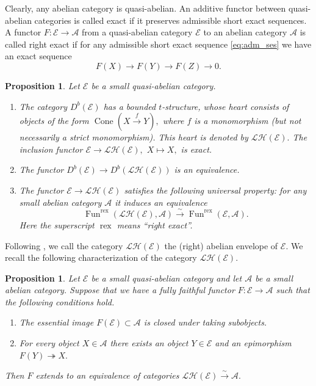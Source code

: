 \documentclass[11pt,leqno]{amsart}
\newtheorem{prop}[theo]{Proposition}
\numberwithin{equation}{section}
\newcommand{\xto}{\xrightarrow}
\newcommand{\onto}{\twoheadrightarrow}
\newcommand{\rex}{\operatorname{rex}}
\newcommand{\Cone}{\operatorname{Cone}}
\newcommand{\cL}{{\mathcal L}}
\newcommand{\cA}{{\mathcal A}}
\newcommand{\cE}{{\mathcal E}}
\newcommand{\cH}{{\mathcal H}}
\newcommand{\Fun}{\operatorname{Fun}}
\begin{document}
Clearly, any abelian category is quasi-abelian. An additive functor between quasi-abelian categories is called exact if it preserves admissible short exact sequences.
A functor $F:\cE\to\cA$ from a quasi-abelian category $\cE$ to an abelian category $\cA$ is called right exact if for any admissible short exact sequence \eqref{eq:adm_ses} we have an exact sequence
\begin{equation*}
F(X)\to F(Y)\to F(Z)\to 0.
\end{equation*}

\begin{prop}\label{prop:generalities_on_abelian_envelope}\cite[Definition 1.2.18, Propositions 1.2.32 and 1.2.34]{Sch99} Let $\cE$ be a small quasi-abelian category. 
\begin{enumerate}[label=(\roman*),ref=(\roman*)]
	\item The category $D^b(\cE)$ has a bounded $t$-structure, whose heart consists of objects of the form $\Cone(X\xto{f} Y),$ where $f$ is a monomorphism (but not necessarily a strict monomorphism). This heart is denoted by $\cL\cH(\cE).$ The inclusion functor $\cE\to\cL\cH(\cE),$ $X\mapsto X,$ is exact.
	\item The functor $D^b(\cE)\to D^b(\cL\cH(\cE))$ is an equivalence.
	\item The functor $\cE\to \cL\cH(\cE)$ satisfies the following universal property: for any small abelian category $\cA$ it induces an equivalence
	\begin{equation*}
	\Fun^{\rex}(\cL\cH(\cE),\cA)\xto{\sim}\Fun^{\rex}(\cE,\cA).
	\end{equation*}
	Here the superscript $\rex$ means ``right exact''.
\end{enumerate}
\end{prop}

Following \cite[Section 1.2.4]{Sch99}, we call the category $\cL\cH(\cE)$ the (right) abelian envelope of $\cE.$ We recall the following characterization of the category $\cL\cH(\cE).$

\begin{prop}\label{prop:characterization_of_LH}\cite[Proposition 1.2.36]{Sch99}
	Let  $\cE$ be a small quasi-abelian category and let $\cA$ be a small abelian category. Suppose that we have a fully faithful functor $F:\cE\to\cA$ such that the following conditions hold.
	\begin{enumerate}[label=(\roman*),ref=(\roman*)]
		\item The essential image $F(\cE)\subset\cA$ is closed under taking subobjects. 
		\item For every object $X\in\cA$ there exists an object $Y\in\cE$ and an epimorphism $F(Y)\onto X.$
	\end{enumerate}
	Then $F$ extends to an equivalence of categories $\cL\cH(\cE)\xto{\sim}\cA.$
\end{prop}
\end{document}
